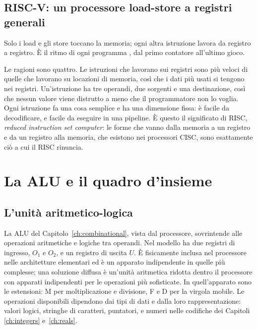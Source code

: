 \subsection{RISC-V: un processore load-store a registri generali}

\begin{prgconcept}
Solo i load e gli store toccano la memoria; ogni altra istruzione lavora da
registro a registro. È il ritmo di ogni programma \riscv, dal primo contatore
all'ultimo gioco.
\end{prgconcept}

Le ragioni sono quattro. Le istruzioni che lavorano sui registri sono più
veloci di quelle che lavorano su locazioni di memoria, così che i dati più
usati si tengono nei registri. Un'istruzione ha tre operandi, due sorgenti e
una destinazione, così che nessun valore viene distrutto a meno che il
programmatore non lo voglia. Ogni istruzione fa una cosa semplice e ha una
dimensione fissa: è facile da decodificare, e facile da eseguire in una
pipeline. È questo il significato di RISC, \emph{reduced instruction set
computer}: le forme che vanno dalla memoria a un registro e da un registro
alla memoria, che esistono nei processori CISC, sono esattamente ciò a cui il
RISC rinuncia.

\section{La ALU e il quadro d'insieme}

\subsection{L'unità aritmetico-logica}

La ALU del Capitolo~\ref{ch:combinational}, vista dal processore, sovrintende
alle operazioni aritmetiche e logiche tra operandi. Nel modello ha due
registri di ingresso, $O_1$ e $O_2$, e un registro di uscita $U$. È
fisicamente inclusa nel processore nelle architetture elementari ed è un
apparato indipendente in quelle più complesse; una soluzione diffusa è
un'unità aritmetica ridotta dentro il processore con apparati indipendenti per
le operazioni più sofisticate. In \riscv quell'apparato sono le estensioni: M
per moltiplicazione e divisione, F e D per la virgola mobile. Le operazioni
disponibili dipendono dai tipi di dati e dalla loro rappresentazione: valori
logici, stringhe di caratteri, puntatori, e numeri nelle codifiche dei
Capitoli \ref{ch:integers} e~\ref{ch:reals}.

